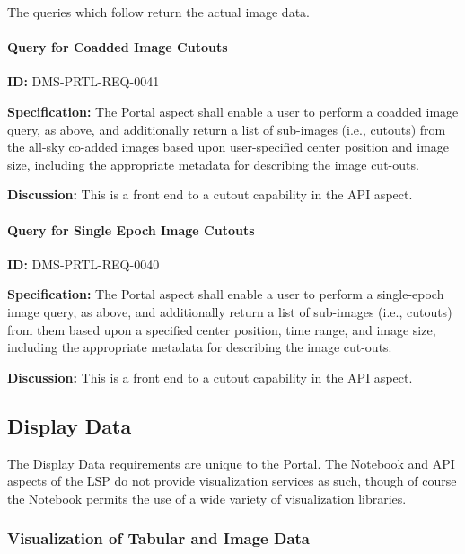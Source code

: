 \documentclass[SE,toc]{lsstdoc}
\begin{document}
The queries which follow return the actual image data.

\paragraph{Query for Coadded Image Cutouts}\hfill  %

\label{DMS-PRTL-REQ-0041}
\textbf{ID:} DMS-PRTL-REQ-0041

\textbf{Specification:}
The Portal aspect shall enable a user to perform a coadded image query, as above, and additionally return a list of sub-images (i.e., cutouts) from the all-sky co-added images based upon user-specified center position and image size, including the appropriate metadata for describing the image cut-outs.

\textbf{Discussion:}
This is a front end to a cutout capability in the API aspect.

\paragraph{Query for Single Epoch Image Cutouts}\hfill  %

\label{DMS-PRTL-REQ-0040}
\textbf{ID:} DMS-PRTL-REQ-0040

\textbf{Specification:}
The Portal aspect shall enable a user to perform a single-epoch image query, as above, and additionally return a list of sub-images (i.e., cutouts) from them based upon a specified center position, time range, and image size, including the appropriate metadata for describing the image cut-outs.

\textbf{Discussion:}
This is a front end to a cutout capability in the API aspect.

\subsection{Display Data}

The Display Data requirements are unique to the Portal.  The Notebook and API aspects of the LSP do not provide visualization services as such, though of course the Notebook permits the use of a wide variety of visualization libraries.

\subsubsection{Visualization of Tabular and Image Data}
\end{document}
